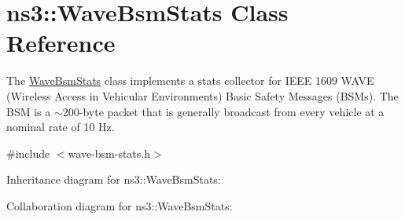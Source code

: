 \hypertarget{classns3_1_1WaveBsmStats}{}\section{ns3\+:\+:Wave\+Bsm\+Stats Class Reference}
\label{classns3_1_1WaveBsmStats}


The \hyperlink{classns3_1_1WaveBsmStats}{Wave\+Bsm\+Stats} class implements a stats collector for I\+E\+EE 1609 W\+A\+VE (Wireless Access in Vehicular Environments) Basic Safety Messages (B\+S\+Ms). The B\+SM is a $\sim$200-\/byte packet that is generally broadcast from every vehicle at a nominal rate of 10 Hz.  




{\ttfamily \#include $<$wave-\/bsm-\/stats.\+h$>$}



Inheritance diagram for ns3\+:\+:Wave\+Bsm\+Stats\+:


Collaboration diagram for ns3\+:\+:Wave\+Bsm\+Stats\+:
